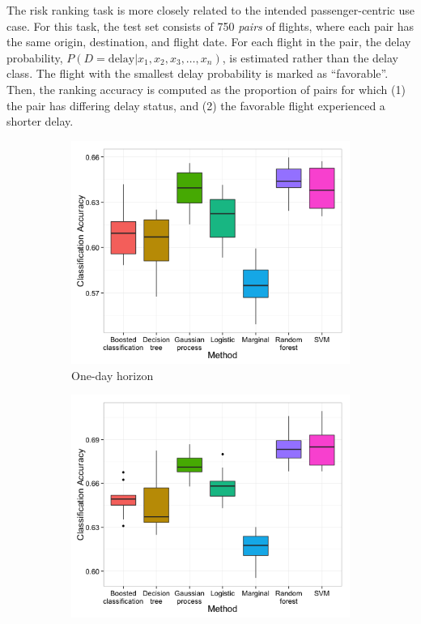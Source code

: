 \documentclass[twocolumn]{article}
\begin{document}
The risk ranking task is more closely related to the intended passenger-centric use case. For this task, the test set consists of 750 \emph{pairs} of flights, where each pair has the same origin, destination, and flight date. For each flight in the pair, the delay probability, $P(D=\text{delay}|x_1, x_2, x_3, \ldots, x_n)$, is estimated rather than the delay class. The flight with the smallest delay probability is marked as ``favorable''. Then, the ranking accuracy is computed as the proportion of pairs for which (1) the pair has differing delay status, and (2) the favorable flight experienced a shorter delay.

\begin{figure}
    \centering
    \begin{subfigure}{0.45\textwidth}
        \centering
        \includegraphics[width=\linewidth]{figures/class-performance-sample-5000-OneDayHorizon.png}
        \caption{One-day horizon}
    \end{subfigure}
    \begin{subfigure}{0.45\textwidth}
        \centering
        \includegraphics[width=\linewidth]{figures/class-performance-sample-5000-OneMonthHorizon.png}

\end{subfigure}
\end{figure}
\end{document}
